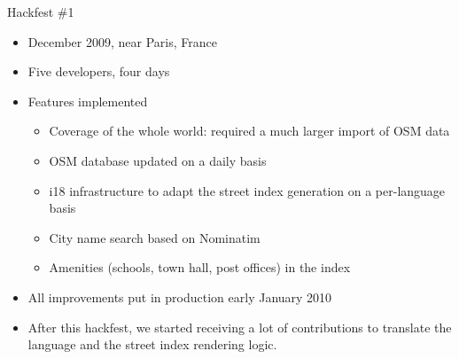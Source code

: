 \documentclass{beamer}
\begin{document}
\begin{frame}{Hackfest \#1}
  \begin{itemize}
  \item December 2009, near Paris, France
  \item Five developers, four days
  \item Features implemented
    \begin{itemize}
    \item Coverage of the whole world: required a much larger import
      of OSM data
    \item OSM database updated on a daily basis
    \item i18 infrastructure to adapt the street index generation on a
      per-language basis
    \item City name search based on Nominatim
    \item Amenities (schools, town hall, post offices) in the index
    \end{itemize}
  \item All improvements put in production early January 2010
  \item After this hackfest, we started receiving a lot of
    contributions to translate the language and the street index
    rendering logic.
  \end{itemize}
\end{frame}
\end{document}
